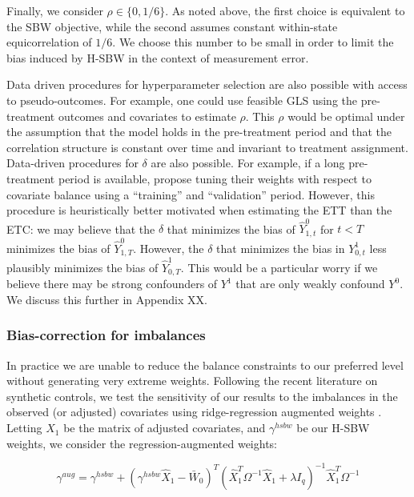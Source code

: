 \documentclass[aoas]{imsart}
\theoremstyle{plain}
\theoremstyle{remark}
\begin{document}
Finally, we consider $\rho \in \{0, 1/6\}$. As noted above, the first choice is equivalent to the SBW objective, while the second assumes constant within-state equicorrelation of $1/6$. We choose this number to be small in order to limit the bias induced by H-SBW in the context of measurement error.

Data driven procedures for hyperparameter selection are also possible with access to pseudo-outcomes. For example, one could use feasible GLS using the pre-treatment outcomes and covariates to estimate $\rho$. This $\rho$ would be optimal under the assumption that the model holds in the pre-treatment period and that the correlation structure is constant over time and invariant to treatment assignment. Data-driven procedures for $\delta$ are also possible. For example, if a long pre-treatment period is available, \cite{abadie2015synthetic} propose tuning their weights with respect to covariate balance using a ``training'' and ``validation'' period. However, this procedure is heuristically better motivated when estimating the ETT than the ETC: we may believe that the $\delta$ that minimizes the bias of $\hat{Y}^0_{1, t}$ for $t < T$ minimizes the bias of $\hat{Y}^0_{1, T}$. However, the $\delta$ that minimizes the bias in $Y^1_{0, t}$ less plausibly minimizes the bias of $\hat{Y}^1_{0, T}$. This would be a particular worry if we believe there may be strong confounders of $Y^1$ that are only weakly confound $Y^0$. We discuss this further in Appendix XX.

\subsubsection{Bias-correction for imbalances}

In practice we are unable to reduce the balance constraints to our preferred level without generating very extreme weights. Following the recent literature on synthetic controls, we test the sensitivity of our results to the imbalances in the observed (or adjusted) covariates using ridge-regression augmented weights \cite{ben2018augmented}. Letting $\hat{X}_1$ be the matrix of adjusted covariates, and $\gamma^{hsbw}$ be our H-SBW weights, we consider the regression-augmented weights:

\begin{equation}
\gamma^{aug} = \gamma^{hsbw} + (\gamma^{hsbw}\hat{X}_1 - \bar{W}_0)^T(\hat{X}_1^T\Omega^{-1}\hat{X}_1 + \lambda I_q)^{-1}\hat{X}_1^T\Omega^{-1}
\end{equation}
\end{document}
